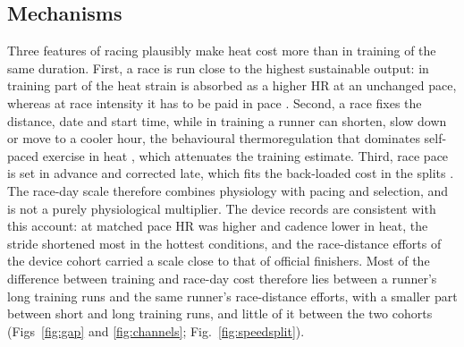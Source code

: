 \documentclass[12pt]{article}
\begin{document}
\subsection{Mechanisms}
Three features of racing plausibly make heat cost more than in training of the same duration. First, a race is run close to the highest sustainable output: in training part of the heat strain is absorbed as a higher HR at an unchanged pace, whereas at race intensity it has to be paid in pace \cite{cheuvront2001,periard2015}. Second, a race fixes the distance, date and start time, while in training a runner can shorten, slow down or move to a cooler hour, the behavioural thermoregulation that dominates self-paced exercise in heat \cite{flouris2015,junge2016}, which attenuates the training estimate. Third, race pace is set in advance and corrected late, which fits the back-loaded cost in the splits \cite{rodrigues2020}. The race-day scale therefore combines physiology with pacing and selection, and is not a purely physiological multiplier. The device records are consistent with this account: at matched pace HR was higher and cadence lower in heat, the stride shortened most in the hottest conditions, and the race-distance efforts of the device cohort carried a scale close to that of official finishers. Most of the difference between training and race-day cost therefore lies between a runner's long training runs and the same runner's race-distance efforts, with a smaller part between short and long training runs, and little of it between the two cohorts (Figs~\ref{fig:gap} and \ref{fig:channels}; Fig.~\ref{fig:speedsplit}).
\end{document}
